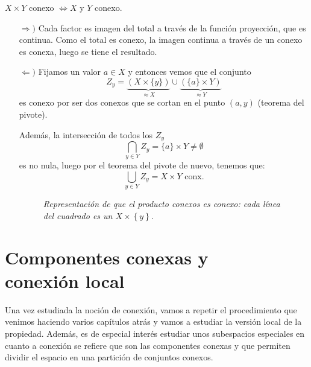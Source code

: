 \begin{prop}
$X \times Y$ conexo $\Leftrightarrow X$ y $Y$ conexo.
\end{prop} 
\begin{demo}
\begin{itemize}
    \item[$\Rightarrow)$] Cada factor es imagen del total a través de la función proyección, que es continua. Como el total es conexo, la imagen continua a través de un conexo es conexa, luego se tiene el resultado.

    \item[$\Leftarrow)$] Fijamos un valor $a \in X$ y entonces vemos que el conjunto
    \[
    Z_y = \underbrace{\left( X \times \{y\} \right)}_{\approx X}\cup \underbrace{\left( \{a\} \times Y \right)}_{\approx Y}
    \]
    es conexo por ser dos conexos que se cortan en el punto $\left( a, y \right)$ (teorema del pivote).
    
    Además, la intersección de todos los $Z_y$
    \[
    \bigcap_{y \in Y} Z_y = \{a\} \times Y \neq \emptyset
    \]
    es no nula, luego por el teorema del pivote de nuevo, tenemos que:
    \[
    \bigcup_{y \in Y} Z_y = X \times Y \text{ conx.}
    \]
    \begin{figure}[H]
        \centering
        \caption{\textit{Representación de que el producto conexos es conexo: cada línea del cuadrado es un $X \times \left\{ y \right\}.$}}
    \end{figure}
\end{itemize}
\end{demo}


\chapter{Componentes conexas y\texorpdfstring{\\}{} conexión local}%
\label{cha:componentes_conexas_y_conexion_local}
Una vez estudiada la noción de conexión, vamos a repetir el procedimiento que venimos haciendo varios capítulos atrás y vamos a estudiar la versión local de la propiedad. Además, es de especial interés estudiar unos subespacios especiales en cuanto a conexión se refiere que son las componentes conexas y que permiten dividir el espacio en una partición de conjuntos conexos.

